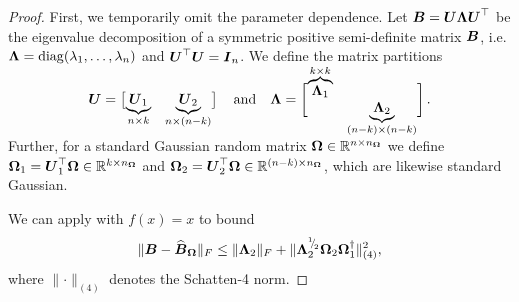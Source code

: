 \documentclass[12pt]{article}
\begin{document}
\begin{proof}
    First, we temporarily omit the parameter dependence. Let $\boldsymbol{B} = \boldsymbol{U} \boldsymbol{\Lambda} \boldsymbol{U}^{\top}$ be the eigenvalue decomposition of a symmetric positive semi-definite matrix $\boldsymbol{B}$, i.e. $\boldsymbol{\Lambda} = \operatorname{diag}(\lambda_1, \dots, \lambda_n)$ and $\boldsymbol{U}^{\top} \boldsymbol{U}= \boldsymbol{I}_n$. We define the matrix partitions
    \begin{equation}
        \rule[\dimexpr-2ex-\ht\strutbox]{0pt}{\dimexpr2ex+4ex+\baselineskip}
        \mtx{U} = \begin{bmatrix}
            \smash{\underbrace{\mtx{U}_1}_{n \times k}} & \smash{\underbrace{\mtx{U}_2}_{n \times (n-k)}}
        \end{bmatrix}
        \quad \text{and} \quad
        \mtx{\Lambda} =
        \begin{bmatrix}
            \smash{\overbrace{\mtx{\Lambda}_1}^{k \times k}} & \\ & \smash{\underbrace{\mtx{\Lambda}_2}_{(n-k) \times (n-k)}}
        \end{bmatrix}.
    \end{equation}
    Further, for a standard Gaussian random matrix $\boldsymbol{\Omega} \in \mathbb{R}^{n \times n_{\boldsymbol{\Omega}}}$ we define $\boldsymbol{\Omega}_1 = \boldsymbol{U}_1^{\top} \boldsymbol{\Omega} \in \mathbb{R}^{k \times n_{\boldsymbol{\Omega}}}$ and $\boldsymbol{\Omega}_2 = \boldsymbol{U}_2^{\top} \boldsymbol{\Omega} \in \mathbb{R}^{(n - k) \times n_{\boldsymbol{\Omega}}}$, which are likewise standard Gaussian.

    We can apply \cite[theorem B.1]{persson-2023-randomized-lowrank} with $f(x) = x$ to bound
    \begin{equation}
        \lVert \boldsymbol{B} - \widehat{\boldsymbol{B}}_{\boldsymbol{\Omega}} \rVert _F 
        \leq  \lVert \boldsymbol{\Lambda}_2 \rVert _F + \lVert \boldsymbol{\Lambda}_2^{{}^{1}{\mskip -5mu/\mskip -3mu}_{2}} \boldsymbol{\Omega}_2 \boldsymbol{\Omega}_1^{\dagger} \rVert _{(4)}^2,
        \label{equ:nystrom-proof-persson-bonud}
    \end{equation}
    where $\lVert \cdot \rVert _{(4)}$ denotes the Schatten-4 norm.
    

\end{proof}
\end{document}
